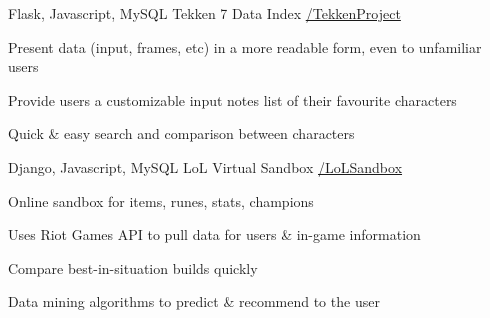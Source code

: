 
\begin{cventries}

  \cventry
    {Flask, Javascript, MySQL} %
    {Tekken 7 Data Index} %
    {\href{https://github.com/basulaib/TekkenProject}{\faGithub /TekkenProject}} %
    {} %
    {
      \begin{cvitems} %
        \item {Present data (input, frames, etc) in a more readable form, even to unfamiliar users}
        \item {Provide users a customizable input notes list of their favourite characters}
        \item {Quick \& easy search and comparison between characters}
      \end{cvitems}
    }
    
  \cventry
    {Django, Javascript, MySQL} %
    {LoL Virtual Sandbox} %
    {\href{https://github.com/basulaib/LoLSandbox}{\faGithub /LoLSandbox}} %
    {} %
    {
      \begin{cvitems} %
        \item {Online sandbox for items, runes, stats, champions}
        \item {Uses Riot Games API to pull data for users \& in-game information}
        \item {Compare best-in-situation builds quickly}
        \item {Data mining algorithms to predict \& recommend to the user}
      \end{cvitems}
    }


\end{cventries}
